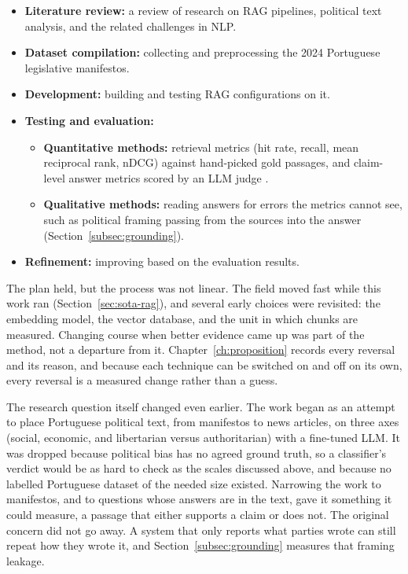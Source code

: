 \begin{itemize}
    \item \textbf{Literature review:} a review of research on RAG pipelines, political text analysis, and the related challenges in NLP.
    \item \textbf{Dataset compilation:} collecting and preprocessing the 2024 Portuguese legislative manifestos.
    \item \textbf{Development:} building \sysname{} and testing RAG configurations on it.
    \item \textbf{Testing and evaluation:}
    \begin{itemize}
        \item \textbf{Quantitative methods:} retrieval metrics (hit rate, recall, mean reciprocal rank, nDCG) against hand-picked gold passages, and claim-level answer metrics scored by an LLM judge \citep{es2024ragas, zheng2023judging}.
        \item \textbf{Qualitative methods:} reading answers for errors the metrics cannot see, such as political framing passing from the sources into the answer (Section~\ref{subsec:grounding}).
    \end{itemize}
    \item \textbf{Refinement:} improving \sysname{} based on the evaluation results.
\end{itemize}

The plan held, but the process was not linear. The field moved fast while this work ran (Section~\ref{sec:sota-rag}), and several early choices were revisited: the embedding model, the vector database, and the unit in which chunks are measured. Changing course when better evidence came up was part of the method, not a departure from it. Chapter~\ref{ch:proposition} records every reversal and its reason, and because each technique can be switched on and off on its own, every reversal is a measured change rather than a guess.

The research question itself changed even earlier. The work began as an attempt to place Portuguese political text, from manifestos to news articles, on three axes (social, economic, and libertarian versus authoritarian) with a fine-tuned LLM. It was dropped because political bias has no agreed ground truth, so a classifier's verdict would be as hard to check as the scales discussed above, and because no labelled Portuguese dataset of the needed size existed. Narrowing the work to manifestos, and to questions whose answers are in the text, gave it something it could measure, a passage that either supports a claim or does not. The original concern did not go away. A system that only reports what parties wrote can still repeat how they wrote it, and Section~\ref{subsec:grounding} measures that framing leakage.

